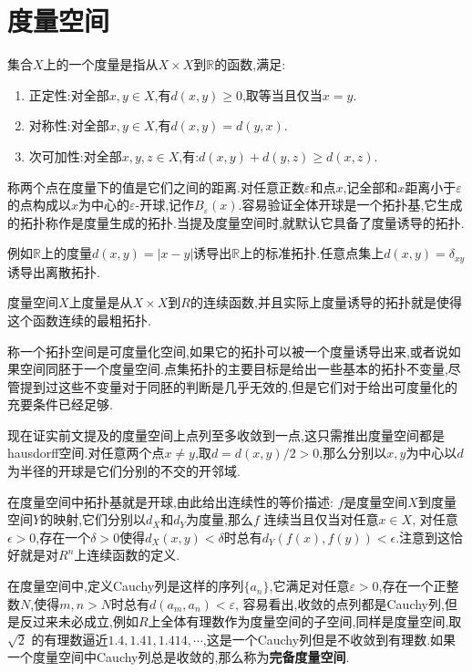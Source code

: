 \section{度量空间}

集合$X$上的一个度量是指从$X\times X$到$\mathbb{R}$的函数,满足:
\begin{enumerate}
	\item 正定性:对全部$x,y\in X$,有$d(x,y)\ge0$,取等当且仅当$x=y$.
	\item 对称性:对全部$x,y\in X$,有$d(x,y)=d(y,x)$.
	\item 次可加性:对全部$x,y,z\in X$,有:$d(x,y)+d(y,z)\ge d(x,z)$.
\end{enumerate}

称两个点在度量下的值是它们之间的距离.对任意正数$\varepsilon$和点$x$,记全部和$x$距离小于$\varepsilon$的点构成以$x$为中心的$\varepsilon$-开球,记作$B_{\varepsilon}(x)$.容易验证全体开球是一个拓扑基,它生成的拓扑称作是度量生成的拓扑.当提及度量空间时,就默认它具备了度量诱导的拓扑.

例如$\mathbb{R}$上的度量$d(x,y)=|x-y|$诱导出$\mathbb{R}$上的标准拓扑.任意点集上$d(x,y)=\delta_{xy}$诱导出离散拓扑.

度量空间$X$上度量是从$X\times X$到$R$的连续函数,并且实际上度量诱导的拓扑就是使得这个函数连续的最粗拓扑.

称一个拓扑空间是可度量化空间,如果它的拓扑可以被一个度量诱导出来,或者说如果空间同胚于一个度量空间.点集拓扑的主要目标是给出一些基本的拓扑不变量,尽管提到过这些不变量对于同胚的判断是几乎无效的,但是它们对于给出可度量化的充要条件已经足够.

现在证实前文提及的度量空间上点列至多收敛到一点,这只需推出度量空间都是hausdorff空间.对任意两个点$x\not=y$,取$d=d(x,y)/2>0$,那么分别以$x,y$为中心以$d$为半径的开球是它们分别的不交的开邻域.

在度量空间中拓扑基就是开球,由此给出连续性的等价描述:
$f$是度量空间$X$到度量空间$Y$的映射,它们分别以$d_{X}$和$d_{Y}$为度量,那么$f$ 连续当且仅当对任意$x\in X$, 对任意$\epsilon>0$,存在一个$\delta>0$使得$d_{X}(x,y)<\delta$时总有$d_ {Y}(f(x),f(y))<\epsilon$.注意到这恰好就是对$R^n$上连续函数的定义.

在度量空间中,定义Cauchy列是这样的序列$\{a_n\}$,它满足对任意$\varepsilon>0$,存在一个正整数$N$,使得$m,n>N$时总有$d(a_m,a_n)<\varepsilon$, 容易看出,收敛的点列都是Cauchy列,但是反过来未必成立,例如$R$上全体有理数作为度量空间的子空间,同样是度量空间,取$\sqrt{2}$ 的有理数逼近$1.4,1.41,1.414,\cdots$,这是一个Cauchy列但是不收敛到有理数.如果一个度量空间中Cauchy列总是收敛的,那么称为\textbf{完备度量空间}.

